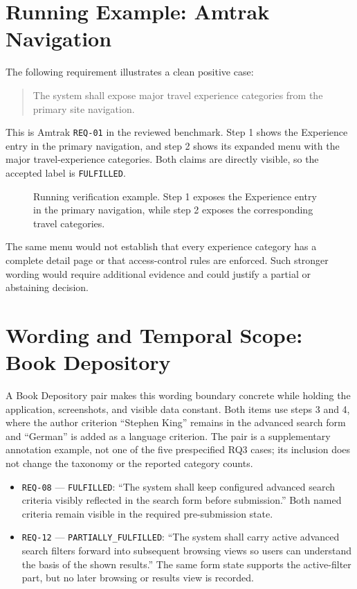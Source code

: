 \section{Running Example: Amtrak Navigation}\label{running-example-amtrak-navigation}

The following requirement illustrates a clean positive case:

\begin{quote}
The system shall expose major travel experience categories from the primary site navigation.
\end{quote}

This is Amtrak \texttt{REQ-01} in the reviewed benchmark. Step 1 shows the
Experience entry in the primary navigation, and step 2 shows its expanded menu
with the major travel-experience categories. Both claims are directly visible,
so the accepted label is \texttt{FULFILLED}.

\begin{figure}[htbp]
  \centering
  \resizebox{0.94\textwidth}{!}{}
  \caption{Running verification example. Step 1 exposes the Experience entry in
  the primary navigation, while step 2 exposes the corresponding travel
  categories.}
  \label{fig:amtrak-running-example}
\end{figure}

The same menu would not establish that every experience category has a complete
detail page or that access-control rules are enforced. Such stronger wording
would require additional evidence and could justify a partial or abstaining
decision.

\section{Wording and Temporal Scope: Book Depository}\label{wording-and-temporal-scope-book-depository}

A Book Depository pair makes this wording boundary concrete while holding the
application, screenshots, and visible data constant. Both items use steps 3
and 4, where the author criterion ``Stephen King'' remains in the advanced search
form and ``German'' is added as a language criterion. The pair is a supplementary
annotation example, not one of the five prespecified RQ3 cases; its inclusion
does not change the taxonomy or the reported category counts.

\begin{itemize}
\tightlist
\item
  \texttt{REQ-08} --- \texttt{FULFILLED}: ``The system shall keep configured advanced search
  criteria visibly reflected in the search form before submission.'' Both named
  criteria remain visible in the required pre-submission state.
\item
  \texttt{REQ-12} --- \texttt{PARTIALLY\_\allowbreak FULFILLED}: ``The system shall carry active advanced
  search filters forward into subsequent browsing views so users can understand
  the basis of the shown results.'' The same form state supports the active-filter
  part, but no later browsing or results view is recorded.
\end{itemize}

